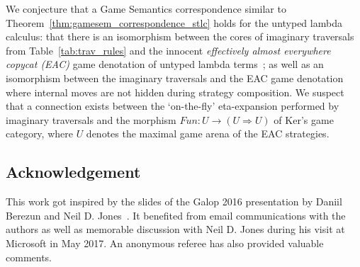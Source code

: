 \documentclass{elsarticle}
\theoremstyle{plain}
\theoremstyle{definition}
\begin{document}
We conjecture that a Game Semantics correspondence similar
to Theorem~\ref{thm:gamesem_correspondence_stlc} holds for
the untyped lambda calculus: that there is an isomorphism between the cores of imaginary traversals from Table~\ref{tab:trav_rules} and the innocent \emph{effectively almost everywhere copycat (EAC)} game denotation of untyped lambda terms~\cite{KerThesis}; as well as an isomorphism between the imaginary traversals and the EAC game denotation where internal moves are not hidden during strategy composition. We suspect that a connection exists between the `on-the-fly' eta-expansion performed by imaginary traversals and the morphism $Fun : U \rightarrow (U \Rightarrow U)$ of Ker's game category, where $U$ denotes the maximal game arena of the EAC strategies.






\subsection*{Acknowledgement}
This work got inspired by the slides of the Galop 2016 presentation by Daniil Berezun and Neil D. Jones~\cite{berezunjones_partialevalbytraversals}. It benefited from email communications with the authors as well as memorable discussion with Neil D. Jones during his visit at Microsoft in May 2017.
An anonymous referee has also provided valuable comments.


\end{document}
